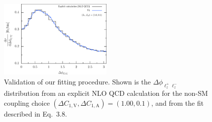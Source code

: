 \documentclass[preprint]{JHEP3} %
\def\DConeA{\Delta C_{1,\mathrm{A}}}
\def\DConeV{\Delta C_{1,\mathrm{V}}}
\begin{document}
\begin{figure}[t]
\centering %
\includegraphics[width=0.49\textwidth]{./LHC_53_Fig17d.eps}
\caption{\label{fig:iv} Validation of our fitting procedure. Shown is the $\Delta \phi_{\ell^+_z \ell^-_z}$ distribution from an explicit NLO QCD calculation 
for the non-SM coupling choice $(\DConeV,\DConeA)=(1.00,0.1)$, and from the fit described in Eq.~3.8. }
\end{figure}
\end{document}
